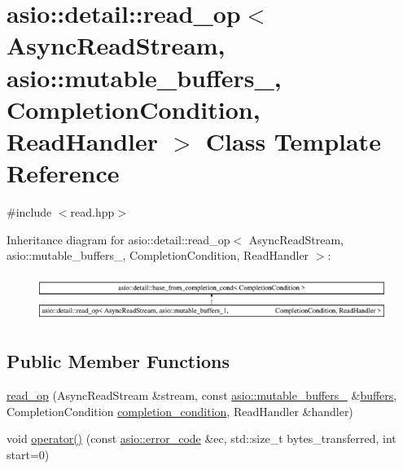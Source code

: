 \hypertarget{classasio_1_1detail_1_1read__op_3_01_async_read_stream_00_01asio_1_1mutable__buffers__1_00_01_018ff00a3c2aa5481d9cf38a1ea7821a38}{}\section{asio\+:\+:detail\+:\+:read\+\_\+op$<$ Async\+Read\+Stream, asio\+:\+:mutable\+\_\+buffers\+\_, Completion\+Condition, Read\+Handler $>$ Class Template Reference}
\label{classasio_1_1detail_1_1read__op_3_01_async_read_stream_00_01asio_1_1mutable__buffers__1_00_01_018ff00a3c2aa5481d9cf38a1ea7821a38}


{\ttfamily \#include $<$read.\+hpp$>$}

Inheritance diagram for asio\+:\+:detail\+:\+:read\+\_\+op$<$ Async\+Read\+Stream, asio\+:\+:mutable\+\_\+buffers\+\_, Completion\+Condition, Read\+Handler $>$\+:\begin{figure}[H]
\begin{center}
\leavevmode
\includegraphics[height=1.515562cm]{classasio_1_1detail_1_1read__op_3_01_async_read_stream_00_01asio_1_1mutable__buffers__1_00_01_018ff00a3c2aa5481d9cf38a1ea7821a38}
\end{center}
\end{figure}
\subsection*{Public Member Functions}
\begin{DoxyCompactItemize}
\item 
\hyperlink{classasio_1_1detail_1_1read__op_3_01_async_read_stream_00_01asio_1_1mutable__buffers__1_00_01_018ff00a3c2aa5481d9cf38a1ea7821a38_afa1f376bf655b4dea2d4a5022f74724b}{read\+\_\+op} (Async\+Read\+Stream \&stream, const \hyperlink{classasio_1_1mutable__buffers__1}{asio\+::mutable\+\_\+buffers\+\_} \&\hyperlink{group__async__read_ga54dede45c3175148a77fe6635222c47d}{buffers}, Completion\+Condition \hyperlink{group__async__read_gae2e215d5013596cc2b385bb6c13fa518}{completion\+\_\+condition}, Read\+Handler \&handler)
\item 
void \hyperlink{classasio_1_1detail_1_1read__op_3_01_async_read_stream_00_01asio_1_1mutable__buffers__1_00_01_018ff00a3c2aa5481d9cf38a1ea7821a38_acc7bc80ea6c7bfabeaa25b137fc744a2}{operator()} (const \hyperlink{classasio_1_1error__code}{asio\+::error\+\_\+code} \&ec, std\+::size\+\_\+t bytes\+\_\+transferred, int start=0)
\end{DoxyCompactItemize}
